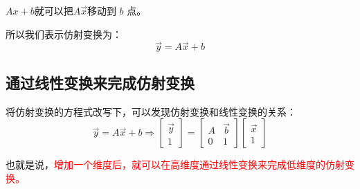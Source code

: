 \documentclass[12pt]{article}
\begin{document}
$Ax+b$就可以把$A\vec{x}$移动到 $b$ 点。

所以我们表示仿射变换为：
$$
\vec{y} = A\vec{x} + b
$$

\subsection{通过线性变换来完成仿射变换}
将仿射变换的方程式改写下，可以发现仿射变换和线性变换的关系：
$$
\vec{y} = A\vec{x} + b \Rightarrow 
\begin{bmatrix}
\vec{y}\\
1
\end{bmatrix} = 
\begin{bmatrix}
A & \vec{b}\\
0 & 1
\end{bmatrix}
\begin{bmatrix}
\vec{x}\\
1
\end{bmatrix}
$$

也就是说，\textcolor{red}{增加一个维度后，就可以在高维度通过线性变换来完成低维度的仿射变换。}
\end{document}
